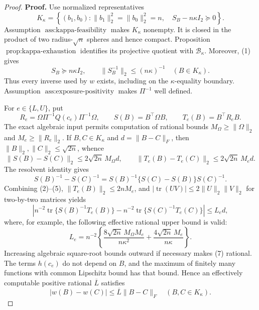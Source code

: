 \documentclass{article}
\begin{document}
\begin{proof}
\textbf{Proof.}
Use normalized representatives
\[
K_\kappa=
\left\{(b_1,b_0):
\lVert b_1\rVert_2^2=\lVert b_0\rVert_2^2=n,
\quad S_B-n\kappa I_2\succeq0
\right\}.
\tag{1}
\]
Assumption \(\operatorname{ass{:}kappa\mbox{-}feasibility}\) makes \(K_\kappa\) nonempty.  It is closed in the product of two radius-\(\sqrt n\) spheres and hence compact.  Proposition \(\operatorname{prop{:}kappa\mbox{-}exhaustion}\) identifies its projective quotient with \(\mathcal B_\kappa\).  Moreover, (1) gives
\[
S_B\succeq n\kappa I_2,
\qquad
\lVert S_B^{-1}\rVert_2\le (n\kappa)^{-1}
\quad(B\in K_\kappa).
\tag{2}
\]
Thus every inverse used by \(w\) exists, including on the \(\kappa\)-equality boundary.  Assumption \(\operatorname{ass{:}exposure\mbox{-}positivity}\) makes \(\Pi^{-1}\) well defined.

For \(e\in\{L,U\}\), put
\[
R_e=\Omega\Pi^{-1}Q(c_e)\Pi^{-1}\Omega,
\qquad
S(B)=B^{\top}\Omega B,
\qquad
T_e(B)=B^{\top}R_eB.
\tag{3}
\]
The exact algebraic input permits computation of rational bounds \(M_\Omega\ge\lVert\Omega\rVert_2\) and \(M_e\ge\lVert R_e\rVert_2\).  If \(B,C\in K_\kappa\) and \(d=\lVert B-C\rVert_F\), then \(\lVert B\rVert_2,\lVert C\rVert_2\le\sqrt{2n}\), whence
\[
\lVert S(B)-S(C)\rVert_2
\le 2\sqrt{2n}\,M_\Omega d,
\qquad
\lVert T_e(B)-T_e(C)\rVert_2
\le 2\sqrt{2n}\,M_e d.
\tag{4}
\]
The resolvent identity gives
\[
S(B)^{-1}-S(C)^{-1}
=S(B)^{-1}\{S(C)-S(B)\}S(C)^{-1}.
\tag{5}
\]
Combining (2)--(5), \(\lVert T_e(B)\rVert_2\le2nM_e\), and \(|\operatorname{tr}(UV)|\le2\lVert U\rVert_2\lVert V\rVert_2\) for two-by-two matrices yields
\[
\left|
n^{-2}\operatorname{tr}\{S(B)^{-1}T_e(B)\}
-n^{-2}\operatorname{tr}\{S(C)^{-1}T_e(C)\}
\right|
\le L_e d,
\tag{6}
\]
where, for example, the following effective rational upper bound is valid:
\[
L_e=
n^{-2}\left\{
\frac{8\sqrt{2n}\,M_\Omega M_e}{n\kappa^2}
+\frac{4\sqrt{2n}\,M_e}{n\kappa}
\right\}.
\tag{7}
\]
Increasing algebraic square-root bounds outward if necessary makes (7) rational.  The terms \(h(c_e)\) do not depend on \(B\), and the maximum of finitely many functions with common Lipschitz bound has that bound.  Hence an effectively computable positive rational \(\overline L\) satisfies
\[
|w(B)-w(C)|\le\overline L\lVert B-C\rVert_F
\quad(B,C\in K_\kappa).
\tag{8}
\]


\end{proof}
\end{document}
